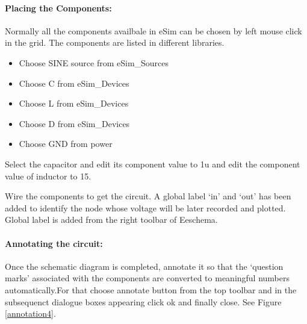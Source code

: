 \paragraph{Placing the Components:} Normally all the components availbale in eSim can be chosen by left mouse click in the grid. The components are listed in different libraries. %


\begin{itemize}
\item
Choose SINE source from eSim\_Sources
\item
Choose C from eSim\_Devices
\item
Choose L from eSim\_Devices
\item
Choose D from eSim\_Devices
\item
Choose GND from power
\end{itemize}

Select the capacitor and edit its component value to 1u and edit the component value of inductor to 15.%


Wire the components to get the circuit. A global label `in'  and `out' has been added to identify the node whose voltage will be later recorded and plotted. Global label is added from the right toolbar of Eeschema.

\paragraph{Annotating the circuit:} Once the schematic diagram is completed, annotate it so that the `question marks' associated with the components are converted to meaningful numbers automatically.For that choose annotate button from the top toolbar and in the subsequenct dialogue boxes appearing click ok and finally close. See Figure \ref{annotation4}.




